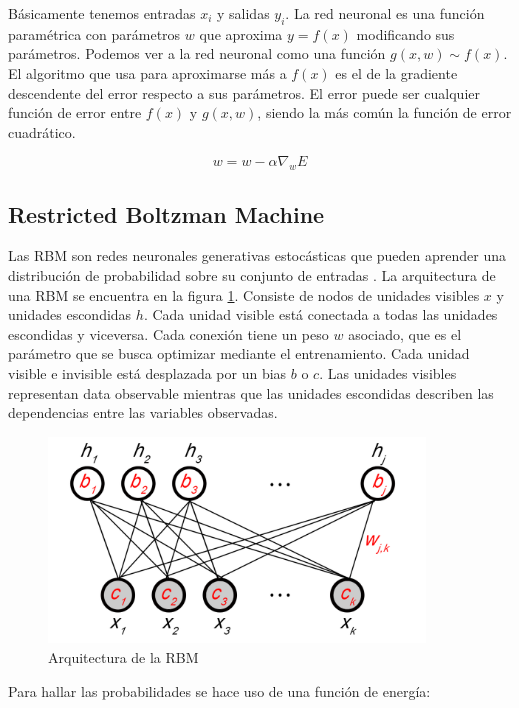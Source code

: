 Básicamente tenemos entradas $x_i$ y salidas $y_i$. La red neuronal es una función paramétrica con parámetros $w$ que aproxima $y = f(x)$ modificando sus parámetros. Podemos ver a la red neuronal como una función $g(x, w) \sim f(x)$. El algoritmo que usa para aproximarse más a $f(x)$ es el de la gradiente descendente del error respecto a sus parámetros. El error puede ser cualquier función de error entre $f(x)$ y $g(x, w)$, siendo la más común la función de error cuadrático.

\begin{equation}
w = w - \alpha \nabla_w E
\end{equation}

\subsection{Restricted Boltzman Machine}

Las \ac{RBM} son redes neuronales generativas estocásticas que pueden aprender una distribución de probabilidad sobre su conjunto de entradas \cite{hinton2010practical}. La arquitectura de una \ac{RBM} se encuentra en la figura \ref{fig:rbm}. Consiste de nodos de unidades visibles $x$ y unidades escondidas $h$. Cada unidad visible está conectada a todas las unidades escondidas y viceversa. Cada conexión tiene un peso $w$ asociado, que es el parámetro que se busca optimizar mediante el entrenamiento. Cada unidad visible e invisible está desplazada por un bias $b$ o $c$. Las unidades visibles representan data observable mientras que las unidades escondidas describen las dependencias entre las variables observadas.

\begin{figure}[htb]
\centering
\includegraphics[width=100mm]{./graficos/rbm.png}
\caption{Arquitectura de la RBM} \label{fig:rbm}
\end{figure}

Para hallar las probabilidades se hace uso de una función de energía:


